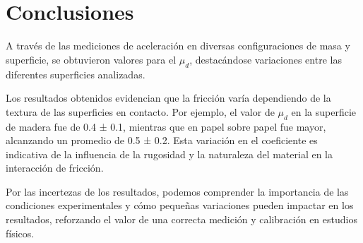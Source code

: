 \documentclass[12pt,a4]{article}
\begin{document}
\section{Conclusiones}

A través de las mediciones de aceleración en diversas configuraciones de masa y superficie, se obtuvieron valores para el $\mu_d$, destacándose variaciones entre las diferentes superficies analizadas.

Los resultados obtenidos evidencian que la fricción varía dependiendo de la textura de las superficies en contacto. Por ejemplo, el valor de $\mu_d$ en la superficie de madera fue de 0.4 ± 0.1, mientras que en papel sobre papel fue mayor, alcanzando un promedio de 0.5 ± 0.2. Esta variación en el coeficiente es indicativa de la influencia de la rugosidad y la naturaleza del material en la interacción de fricción.

Por las incertezas de los resultados, podemos comprender la importancia de las condiciones experimentales y cómo pequeñas variaciones pueden impactar en los resultados, reforzando el valor de una correcta medición y calibración en estudios físicos.
\end{document}
